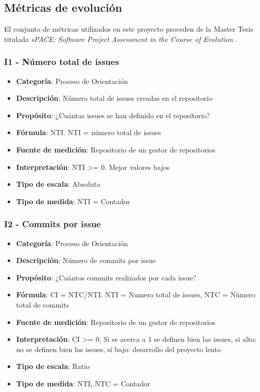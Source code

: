 \subsection{Métricas de evolución}
El conjunto de métricas utilizados en este proyecto proceden de la Master Tesis titulada \textit{sPACE: Software Project Assessment in the Course of Evolution} \cite{ratzinger_space:_2007}.

\subsubsection{I1 - Número total de issues}
\begin{itemize}
	\item \textbf{Categoría}: Proceso de Orientación
	\item \textbf{Descripción}: Número total de issues creadas en el repositorio
	\item \textbf{Propósito}: ¿Cuántas issues se han definido en el repositorio?
	\item \textbf{Fórmula}: NTI. NTI = número total de issues
	\item \textbf{Fuente de medición}: Repositorio de un gestor de repositorios
	\item \textbf{Interpretación}: NTI >= 0. Mejor valores bajos
	\item \textbf{Tipo de escala}: Absoluta
	\item \textbf{Tipo de medida}: NTI = Contador
\end{itemize}
\subsubsection{I2 - Commits por issue}
\begin{itemize}
	\item \textbf{Categoría}: Proceso de Orientación
	\item \textbf{Descripción}: Número de commits por issue
	\item \textbf{Propósito}: ¿Cuántos commits realizados por cada issue?
	\item \textbf{Fórmula}: CI = NTC/NTI. NTI = Numero total de issues, NTC = Número total de commits
	\item \textbf{Fuente de medición}: Repositorio de un gestor de repositorios
	\item \textbf{Interpretación}: CI >= 0, Si se acerca a 1 se definen bien las issues, si alto: no se definen bien las issues, si bajo: desarrollo del proyecto lento
	\item \textbf{Tipo de escala}: Ratio 
	\item \textbf{Tipo de medida}: NTI, NTC = Contador
\end{itemize}
